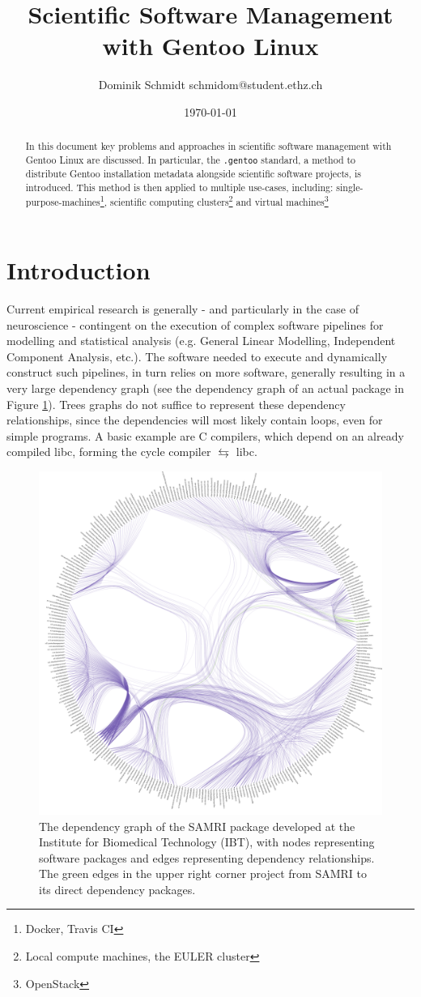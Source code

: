 \documentclass[11pt]{scrartcl}
\author{Dominik Schmidt \textsf{schmidom@student.ethz.ch}}
\title{Scientific Software Management with Gentoo Linux}
\date{\today}
\newcommand{\dg}[1]{\texttt{#1}}
\begin{document}
	\maketitle
	\begin{abstract}
		In this document key problems and approaches in scientific
		software management with Gentoo Linux are discussed.
		In particular, the \dg{.gentoo} standard, a method to distribute Gentoo installation metadata alongside scientific software projects, is introduced.
		This method is then applied to multiple use-cases, including:
		single-purpose-machines\footnote{Docker, Travis CI},
		scientific computing clusters\footnote{Local compute machines, the EULER cluster}
		and virtual machines\footnote{OpenStack}
	\end{abstract}
	\section{Introduction}
		Current empirical research is generally - and particularly in the case of neuroscience - contingent on the execution of complex software pipelines for modelling and statistical analysis (e.g. General Linear Modelling, Independent Component Analysis, etc.).
		The software needed to execute and dynamically construct such pipelines, in turn relies on more software, generally resulting in a very large dependency graph (see the dependency graph of an actual package in Figure \ref{fig:real_depgraph}).
		Trees graphs do not suffice to represent these dependency relationships, since the dependencies will most likely contain loops, even for simple programs. A basic example are C compilers, which depend on an already compiled libc, forming the cycle compiler $\leftrightarrows$ libc.

		\begin{figure}[h]
			\centering
			\includegraphics[width=0.75\linewidth]{graph/Real_Dependencygraph/RealDepgraph2.png}
			\caption[The dependency graph of the SAMRI package]{The dependency graph of the SAMRI package developed at the Institute for Biomedical Technology (IBT), with nodes representing software packages and edges representing dependency relationships. The green edges in the upper right corner project from SAMRI to its direct dependency packages.}
			\label{fig:real_depgraph}
		\end{figure}
		
\end{document}
